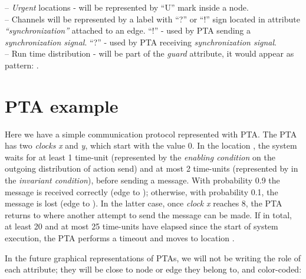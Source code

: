 – \textit{Urgent} locations - will be represented by “U” mark inside a node.\\
– Channels will be represented by a label with “?” or “!” sign located in attribute \textit{“synchronization”} attached to an edge. “!” - used by PTA sending a \textit{synchronization signal}. “?” - used by PTA receiving \textit{synchronization signal}. \\
– Run time distribution - will be part of the \textit{guard} attribute, it would appear as pattern: .\\
\section{PTA example}
Here we have a simple communication protocol represented with PTA. The PTA has two \textit{clocks} \textit{x} and \textit{y}, which start with the value 0. In the location , the system waits for at least 1 time-unit (represented by the \textit{enabling condition}  on the outgoing distribution of action send) and at most 2 time-units (represented by  in the \textit{\textit{invariant condition}}), before sending a message. With probability 0.9 the message is received correctly (edge to ); otherwise, with probability 0.1, the message is lost (edge to ). In the latter case, once \textit{clock} \textit{x} reaches 8, the PTA returns to  where another attempt to send the message can be made. If in total, at least 20 and at most 25 time-units have elapsed since the start of system execution, the PTA performs a timeout and moves to location .    
\par In the future graphical representations of PTAs, we will not be writing the role of each attribute; they will be close to node or edge they belong to, and color-coded:\\
